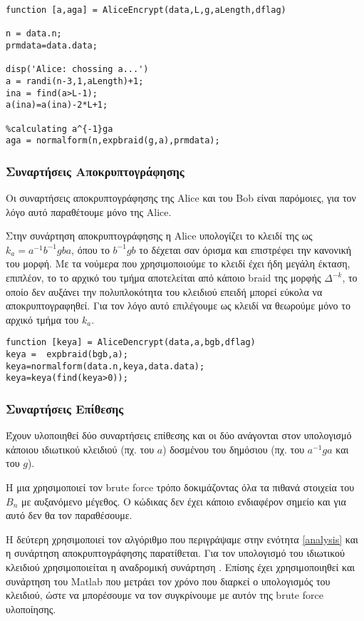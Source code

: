 \begin{lstlisting}
function [a,aga] = AliceEncrypt(data,L,g,aLength,dflag)

n = data.n;
prmdata=data.data;

disp('Alice: chossing a...')
a = randi(n-3,1,aLength)+1;
ina = find(a>L-1);
a(ina)=a(ina)-2*L+1;

%calculating a^{-1}ga
aga = normalform(n,expbraid(g,a),prmdata);
\end{lstlisting}  

\subsubsection{Συναρτήσεις Αποκρυπτογράφησης}

Οι συναρτήσεις αποκρυπτογράφησης της Alice και του Bob είναι παρόμοιες, για τον λόγο αυτό παραθέτουμε μόνο της Alice.

Στην συνάρτηση αποκρυπτογράφησης η Alice υπολογίζει το κλειδί της ως \\$ k_a = a^{-1}b^{-1}gba $, όπου το $b^{-1}gb$ το δέχεται σαν όρισμα και επιστρέφει την κανονική του μορφή. Με τα νούμερα που χρησιμοποιούμε το κλειδί έχει ήδη μεγάλη έκταση, επιπλέον, το το αρχικό του τμήμα αποτελείται από κάποιο braid της μορφής $ \Delta^{-k} $, το οποίο δεν αυξάνει την πολυπλοκότητα του κλειδιού επειδή μπορεί εύκολα να αποκρυπτογραφηθεί. Για τον λόγο αυτό επιλέγουμε ως κλειδί να θεωρούμε μόνο το αρχικό τμήμα του $ k_a $.
\begin{lstlisting}
function [keya] = AliceDencrypt(data,a,bgb,dflag)
keya =  expbraid(bgb,a);
keya=normalform(data.n,keya,data.data);
keya=keya(find(keya>0));
\end{lstlisting}

\subsubsection{Συναρτήσεις Επίθεσης}

Έχουν υλοποιηθεί δύο συναρτήσεις επίθεσης και οι δύο ανάγονται στον υπολογισμό κάποιου ιδιωτικού κλειδιού (πχ. του $ a $) δοσμένου του δημόσιου (πχ. του $ a^{-1}ga $ και του $ g $).

Η μια χρησιμοποιεί τον brute force τρόπο δοκιμάζοντας όλα τα πιθανά στοιχεία του $ B_n $ με αυξανόμενο μέγεθος. Ο κώδικας δεν έχει κάποιο ενδιαφέρον σημείο και για αυτό δεν θα τον παραθέσουμε.

Η δεύτερη χρησιμοποιεί τον αλγόριθμο που περιγράψαμε στην ενότητα \ref{analysis} και η συνάρτηση αποκρυπτογράφησης παρατίθεται. Για τον υπολογισμό του ιδιωτικού κλειδιού χρησιμοποιείται η αναδρομική συνάρτηση . Επίσης έχει χρησιμοποιηθεί και συνάρτηση του Matlab που μετράει τον χρόνο που διαρκεί ο υπολογισμός του κλειδιού, ώστε να μπορέσουμε να τον συγκρίνουμε με αυτόν της brute force υλοποίησης.

